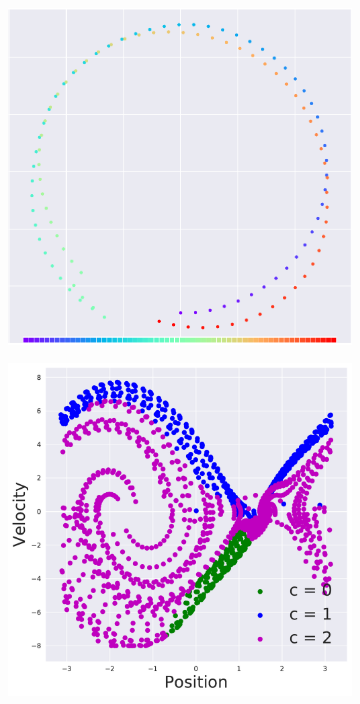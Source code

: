 \documentclass{article} %
\begin{document}
\begin{figure}[t]
\begin{subfigure}{0.24\columnwidth}
    \caption{}
    \end{subfigure}
    \centering
    \begin{subfigure}{0.24\columnwidth}
    \centering
    \includegraphics[scale=0.185]{figures/circle_trajs/result_4_rainbow_cropped.pdf}
    \caption{}
    \end{subfigure}
    \centering
    \begin{subfigure}{0.24\columnwidth}
    \centering
    \includegraphics[scale=0.169]{figures/pendulum/context_output.pdf}

\end{subfigure}
\end{figure}
\end{document}
